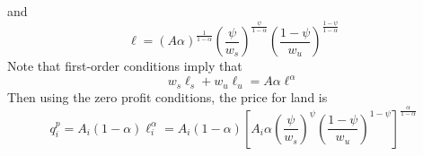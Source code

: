 \documentclass[12pt]{article}
\begin{document}
and 
\begin{equation*}
    \ell = (A\alpha)^{\frac{1}{1-\alpha}}\left(\frac{\psi}{w_s}\right)^{\frac{\psi}{1-\alpha}}\left(\frac{1-\psi}{w_u}\right)^{\frac{1-\psi}{1-\alpha}}
\end{equation*}
Note that first-order conditions imply that 
\begin{equation*}
    w_s\ell_s +  w_u\ell_u = A\alpha\ell^\alpha
\end{equation*}
Then using the zero profit conditions, the price for land is 
\begin{equation*}
    q_i^p = A_i(1-\alpha)\ell_i^\alpha = A_i(1-\alpha)\left[A_i\alpha\left(\frac{\psi}{w_s}\right)^{\psi}\left(\frac{1-\psi}{w_u}\right)^{1-\psi}\right]^{\frac{\alpha}{1-\alpha}}
\end{equation*}
\end{document}
